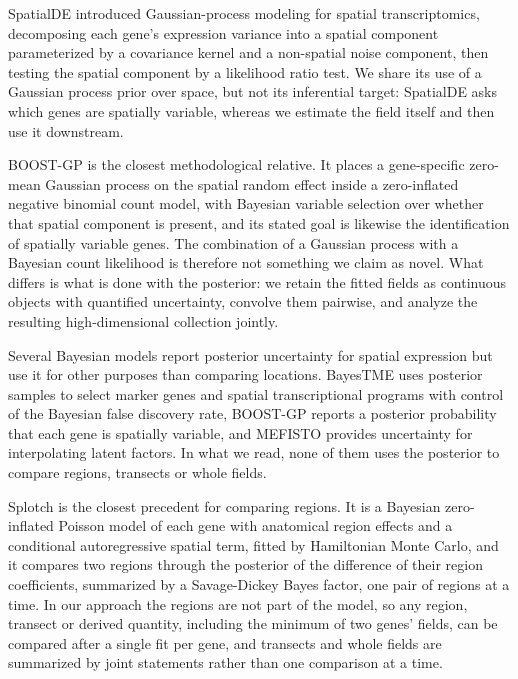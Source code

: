 \documentclass[10pt,letterpaper]{article}
\begin{document}
SpatialDE \cite{Svensson2018} introduced Gaussian-process modeling for spatial transcriptomics, decomposing each gene's expression variance into a spatial component parameterized by a covariance kernel and a non-spatial noise component, then testing the spatial component by a likelihood ratio test. We share its use of a Gaussian process prior over space, but not its inferential target: SpatialDE asks which genes are spatially variable, whereas we estimate the field itself and then use it downstream.

BOOST-GP \cite{Li2021} is the closest methodological relative. It places a gene-specific zero-mean Gaussian process on the spatial random effect inside a zero-inflated negative binomial count model, with Bayesian variable selection over whether that spatial component is present, and its stated goal is likewise the identification of spatially variable genes. The combination of a Gaussian process with a Bayesian count likelihood is therefore not something we claim as novel. What differs is what is done with the posterior: we retain the fitted fields as continuous objects with quantified uncertainty, convolve them pairwise, and analyze the resulting high-dimensional collection jointly.

Several Bayesian models report posterior uncertainty for spatial expression but use it for other purposes than comparing locations. BayesTME \cite{zhang2023bayestme} uses posterior samples to select marker genes and spatial transcriptional programs with control of the Bayesian false discovery rate, BOOST-GP reports a posterior probability that each gene is spatially variable, and MEFISTO \cite{velten2022mefisto} provides uncertainty for interpolating latent factors. In what we read, none of them uses the posterior to compare regions, transects or whole fields.

Splotch \cite{aijo2019splotch} is the closest precedent for comparing regions. It is a Bayesian zero-inflated Poisson model of each gene with anatomical region effects and a conditional autoregressive spatial term, fitted by Hamiltonian Monte Carlo, and it compares two regions through the posterior of the difference of their region coefficients, summarized by a Savage-Dickey Bayes factor, one pair of regions at a time. In our approach the regions are not part of the model, so any region, transect or derived quantity, including the minimum of two genes' fields, can be compared after a single fit per gene, and transects and whole fields are summarized by joint statements rather than one comparison at a time.
\end{document}
